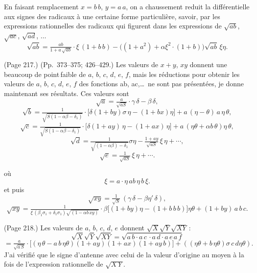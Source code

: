 \documentclass[11pt,a4paper]{book}
\begin{document}
En faisant remplacement $x = b\,b$, $y = a\,a$, on a chaussement reduit la diff\'erentielle aux signes des radicaux \`a une certaine forme particuli\`ere, savoir, par les expressions rationnelles des radicaux qui figurent dans les expressions de $\sqrt{a b}$, $\sqrt{a c}$, $\sqrt{a d}$, $\ldots$
\[
\sqrt{a b} = \tfrac{a b}{1 + a\,\sqrt{a b}}\cdot \xi\,(1 + b\,b) - \big((1 + a^2) + \alpha \xi^2 \cdot (1 + b)\big)\sqrt{a b}\,\xi \eta.
\]

\medskip

\noindent (Page 217.) (Pp.~373--375; 426--429.) Les valeurs de $x + y$, $xy$ donnent une beaucoup de point\,faible de $a$, $b$, $c$, $d$, $e$, $f$, mais les r\'eductions pour obtenir les valeurs de $a$, $b$, $c$, $d$, $e$, $f$ des fonctions ab, ac,\ldots\ ne sont pas pr\'esent\'ees, je donne maintenant ses r\'esultats. Ces valeurs sont
\[
\sqrt{a} = \tfrac{a}{\sqrt{a S}} \cdot \gamma\,\delta - \beta\,\delta,
\]
\[
\sqrt{b} = \tfrac{1}{\sqrt{S(1 - \alpha\beta - \delta_1)}}\cdot \big[\delta(1 + by)\sigma\,\eta - (1 + b x)\eta\big] + a\,(\eta - \theta)\,a\,\eta\,\theta,
\]
\[
\sqrt{c} = \tfrac{1}{\sqrt{S(1 - \alpha\beta - \delta_1)}}\cdot \big[\delta(1 + ay)\,\eta - (1 + a x)\,\eta\big] + a\,(\eta\theta + \alpha b\,\theta)\eta\,\theta,
\]
\[
\sqrt{d} = \tfrac{1}{\sqrt{(1 - \alpha\beta) - \delta_1}}\sigma\eta - \tfrac{1 + a y}{\sqrt{a S}}\,\xi\,\eta + \cdots,
\]
\[
\sqrt{e} = \tfrac{1}{\sqrt{a S}}\,\xi\,\eta + \cdots.
\]

o\`u
\[
\xi = a \cdot \eta\,a b\,\eta\,b\,\xi.
\]
et puis
\[
\sqrt{x y} = \tfrac{1}{\sqrt{S}}\,(\gamma\,\delta - \beta\eta'\,\delta),
\]
\[
\sqrt{x y} = \tfrac{1}{\xi\,(\beta_1\sigma_1 + \delta_1\sigma_1)\sqrt{(1 - \alpha b\,x y)}}\cdot \beta\big[(1 + by)\eta - (1 + b\,b\,b)\big]\eta\theta + (1 + by)\,a\,b\,c.
\]

\medskip

\noindent (Page 218.) Les valeurs de $a$, $b$, $c$, $d$, $e$ donnent $\sqrt{X}\sqrt{Y}\sqrt{X Y}$\,:
\[
\sqrt{X}\sqrt{Y}\sqrt{XY} = \sqrt{a\,b\cdot a\,c\,\cdot a\,d\cdot a\,e\,a\,f}
\]
\[
= \tfrac{a}{\sqrt{a\,S}} \cdot \big[(\eta\,\theta - a\,b\,\eta\theta)(1 + a y)(1 + a x)(1 + ay\,b)\big] + ((\eta\theta + b\,\eta\theta)\sigma\,c\,d\eta\theta).
\]
J'ai v\'erifi\'e que le signe d'antenne avec celui de la valeur d'origine au moyen \`a la fois de l'expression rationnelle de $\sqrt{X\,Y}$.
\end{document}
